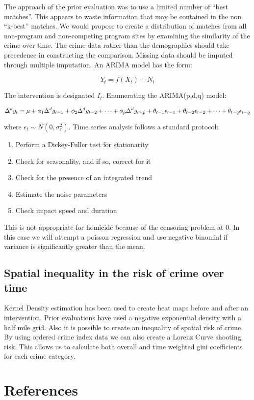 \documentclass[11pt]{article}
\begin{document}
The approach of the prior evaluation was to use a limited number of
``best matches''.  This appears to waste information that may be
contained in the non ``k-best'' matches.  We would propose to create a
distribution of matches from all non-program and non-competing program
sites by examining the similarity of the crime over time.  The crime
data rather than the demographics should take precedence in
constructing the comparison.  Missing data should be imputed through
multiple imputation.  An ARIMA model has the form:

\begin{equation}
Y_t=f(X_t)+N_t
\end{equation}

The intervention is designated \( I_t \).  Enumerating the ARIMA(p,d,q) model:

\begin{equation}
\Delta^d y_t = \mu + \phi_1 \Delta^d y_{t-1} + \phi_2 \Delta^d y_{t-2} + \cdots + \phi_p \Delta^d y_{t-p} + \\
\theta_{t-1} \epsilon_{t-1} + \theta_{t-2} \epsilon_{t-2} + \cdots + \theta_{t-q} \epsilon_{t-q}
\end{equation}

where \( \epsilon_t \sim N(0, \sigma^2_{\epsilon}) \).  Time series analysis follows a standard protocol:

\begin{enumerate}
\item Perform a Dickey-Fuller test for stationarity
\item Check for seasonality, and if so, correct for it
\item Check for the presence of an integrated trend
\item Estimate the noise parameters
\item Check impact speed and duration
\end{enumerate}

This is not appropriate for homicide because of the censoring problem at 0.  In this case we will attempt a
poisson regression and use negative binomial if variance is significantly greater than the mean.
\subsection{Spatial inequality in the risk of crime over time}
\label{sec-2-2}

Kernel Density estimation has been used to create heat maps before and after an intervention.  Prior 
evaluations have used a negative exponential density with a half mile grid.  Also it is possible to
create an inequality of spatial risk of crime.  By using ordered crime index data we can also create a
Lorenz Curve shooting risk.  This allows us to calculate both overall and time weighted gini coefficients 
for each crime category.
\section{References}
\label{sec-3}

\printbibliography[heading=none]
\end{document}

